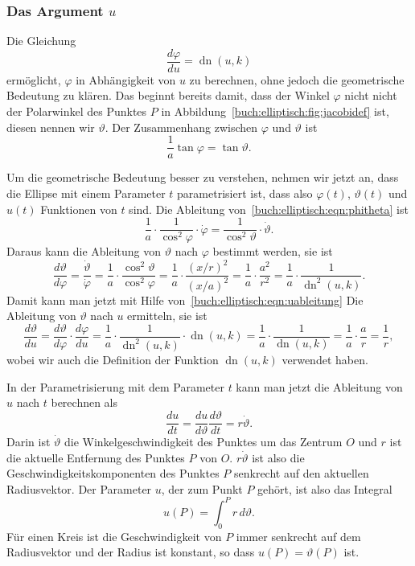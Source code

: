 %
%
\subsubsection{Das Argument $u$}
Die Gleichung 
\begin{equation}
\frac{d\varphi}{du}
=
\operatorname{dn}(u,k)
\label{buch:elliptisch:eqn:uableitung}
\end{equation}
ermöglicht, $\varphi$ in Abhängigkeit von $u$ zu berechnen, ohne jedoch
die geometrische Bedeutung zu klären.
Das beginnt bereits damit, dass der Winkel $\varphi$ nicht nicht der
Polarwinkel des Punktes $P$ in Abbildung~\ref{buch:elliptisch:fig:jacobidef}
ist, diesen nennen wir $\vartheta$.
Der Zusammenhang zwischen $\varphi$ und $\vartheta$ ist
\begin{equation}
\frac1{a}\tan\varphi = \tan\vartheta.
\label{buch:elliptisch:eqn:phitheta}
\end{equation}

Um die geometrische Bedeutung besser zu verstehen, nehmen wir jetzt an,
dass die Ellipse mit einem Parameter $t$ parametrisiert ist, dass also
$\varphi(t)$, $\vartheta(t)$ und $u(t)$ Funktionen von $t$ sind.
Die Ableitung von~\eqref{buch:elliptisch:eqn:phitheta} ist
\[
\frac1{a}\cdot \frac{1}{\cos^2\varphi}\cdot \dot{\varphi}
=
\frac{1}{\cos^2\vartheta}\cdot \dot{\vartheta}.
\]
Daraus kann die Ableitung von $\vartheta$ nach $\varphi$ bestimmt
werden, sie ist
\[
\frac{d\vartheta}{d\varphi}
=
\frac{\dot{\vartheta}}{\dot{\varphi}}
=
\frac{1}{a}
\cdot
\frac{\cos^2\vartheta}{\cos^2\varphi}
=
\frac{1}{a}
\cdot
\frac{(x/r)^2}{(x/a)^2}
=
\frac{1}{a}\cdot
\frac{a^2}{r^2}
=
\frac{1}{a}\cdot\frac{1}{\operatorname{dn}^2(u,k)}.
\]
Damit kann man jetzt mit Hilfe von~\eqref{buch:elliptisch:eqn:uableitung} 
Die Ableitung von $\vartheta$ nach $u$ ermitteln, sie ist
\[
\frac{d\vartheta}{du}
=
\frac{d\vartheta}{d\varphi}
\cdot
\frac{d\varphi}{du}
=
\frac{1}{a}\cdot\frac{1}{\operatorname{dn}^2(u,k)}
\cdot
\operatorname{dn}(u,k)
=
\frac{1}{a}
\cdot
\frac{1}{\operatorname{dn}(u,k)}
=
\frac{1}{a}
\cdot\frac{a}{r}
=
\frac{1}{r},
\]
wobei wir auch die Definition der Funktion $\operatorname{dn}(u,k)$
verwendet haben.

In der Parametrisierung mit dem Parameter $t$ kann man jetzt die Ableitung
von $u$ nach $t$ berechnen als
\[
\frac{du}{dt}
=
\frac{du}{d\vartheta}
\frac{d\vartheta}{dt}
=
r
\dot{\vartheta}.
\]
Darin ist $\dot{\vartheta}$ die Winkelgeschwindigkeit des Punktes um
das Zentrum $O$ und $r$ ist die aktuelle Entfernung des Punktes $P$
von $O$.
$r\dot{\vartheta}$ ist also die Geschwindigkeitskomponenten des Punktes
$P$ senkrecht auf den aktuellen Radiusvektor.
Der Parameter $u$, der zum Punkt $P$ gehört, ist also das Integral
\[
u(P) = \int_0^P r\,d\vartheta.
\]
Für einen Kreis ist die Geschwindigkeit von $P$ immer senkrecht
auf dem Radiusvektor und der Radius ist konstant, so dass
$u(P)=\vartheta(P)$ ist.

